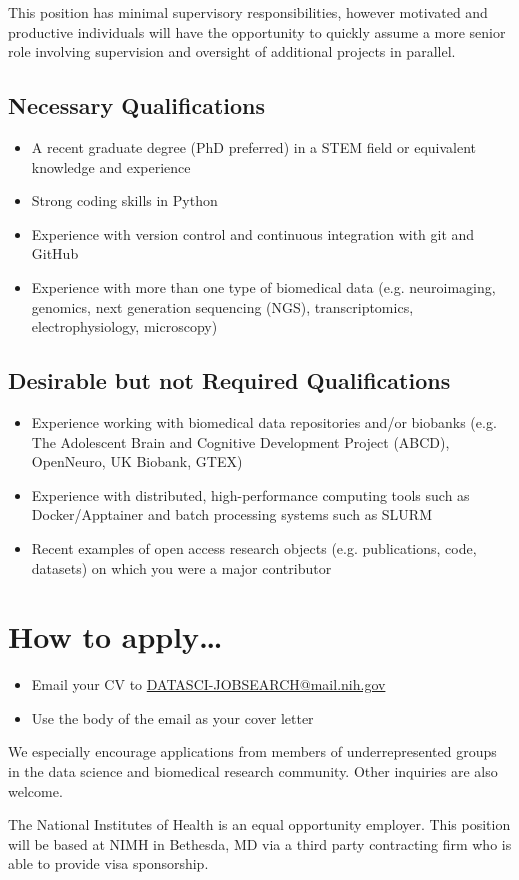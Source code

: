 \documentclass[10pt,letterpaper]{article}
\begin{document}
\begin{multicols}{2}
This position has minimal supervisory responsibilities, however motivated and productive individuals will have the opportunity to quickly assume a more senior role involving supervision and oversight of additional projects in parallel.

\subsection*{Necessary Qualifications}
\begin{itemize}[leftmargin=*, noitemsep, topsep=0pt]
    \item A recent graduate degree (PhD preferred) in a STEM field or equivalent knowledge and experience
    \item Strong coding skills in Python
    \item Experience with version control and continuous integration with git and GitHub
    \item Experience with more than one type of biomedical data (e.g. neuroimaging, genomics, next generation sequencing (NGS), transcriptomics, electrophysiology, microscopy)
\end{itemize}

\subsection*{Desirable but not Required Qualifications}
\begin{itemize}[leftmargin=*, noitemsep, topsep=0pt]
    \item Experience working with biomedical data repositories and/or biobanks (e.g. The Adolescent Brain and Cognitive Development Project (ABCD), OpenNeuro, UK Biobank, GTEX)
    \item Experience with distributed, high-performance computing tools such as Docker/Apptainer and batch processing systems such as SLURM
    \item Recent examples of open access research objects (e.g. publications, code, datasets) on which you were a major contributor
\end{itemize}

\section*{How to apply…}
\begin{itemize}[leftmargin=*, noitemsep, topsep=0pt]
    \item Email your CV to \href{mailto:DATASCI-JOBSEARCH@mail.nih.gov}{DATASCI-JOBSEARCH@mail.nih.gov}
    \item Use the body of the email as your cover letter
\end{itemize}

We especially encourage applications from members of underrepresented groups in the data science and biomedical research community. Other inquiries are also welcome.

The National Institutes of Health is an equal opportunity employer. This position will be based at NIMH in Bethesda, MD via a third party contracting firm who is able to provide visa sponsorship.
\end{multicols}
\end{document}

